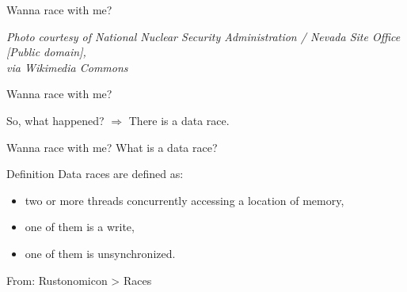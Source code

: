 \documentclass[handout]{beamer} %
\begin{document}
\begin{frame}{Wanna race with me?}
	\begin{center}
	\end{center}
	\raggedleft
	\tiny{\textit{Photo courtesy of National Nuclear Security Administration
	/ Nevada Site Office [Public domain],\\ via Wikimedia Commons}}
\end{frame}


\begin{frame}{Wanna race with me?}
	\begin{center}
		So, what happened?
		\vfill\pause
		$\Rightarrow$ There is a data race.
	\end{center}	
\end{frame}


\begin{frame}{Wanna race with me?}
	What is a data race?
	\begin{block}{Definition}
	Data races are defined as:
	\begin{itemize}
		\item two or more threads concurrently accessing a location of memory,
		\item one of them is a write,
		\item one of them is unsynchronized.
	\end{itemize}
	\raggedleft From: Rustonomicon > Races
	\end{block}
	\vfill
\end{frame}

\end{document}
